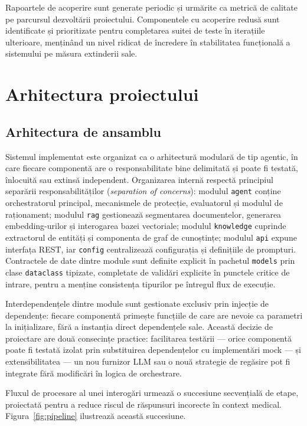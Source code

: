 \documentclass[12pt, a4paper, oneside, romanian]{teza-upb}
\begin{document}
Rapoartele de acoperire sunt generate periodic și urmărite ca metrică de calitate pe parcursul dezvoltării proiectului. Componentele cu acoperire redusă sunt identificate și prioritizate pentru completarea suitei de teste în iterațiile ulterioare, menținând un nivel ridicat de încredere în stabilitatea funcțională a sistemului pe măsura extinderii sale.

\chapter{Arhitectura proiectului}

\section{Arhitectura de ansamblu}
\label{sec:ansamblu}

Sistemul implementat este organizat ca o arhitectură modulară de tip agentic, în care fiecare componentă are o responsabilitate bine delimitată și poate fi testată, înlocuită sau extinsă independent. Organizarea internă respectă principiul separării responsabilităților (\textit{separation of concerns}): modulul \texttt{agent} conține orchestratorul principal, mecanismele de protecție, evaluatorul și modulul de raționament; modulul \texttt{rag} gestionează segmentarea documentelor, generarea embedding-urilor și interogarea bazei vectoriale; modulul \texttt{knowledge} cuprinde extractorul de entități și componenta de graf de cunoștințe; modulul \texttt{api} expune interfața REST, iar \texttt{config} centralizează configurația și definițiile de prompturi. Contractele de date dintre module sunt definite explicit în pachetul \texttt{models} prin clase \texttt{dataclass} tipizate, completate de validări explicite în punctele critice de intrare, pentru a menține consistența tipurilor pe întregul flux de execuție.

Interdependențele dintre module sunt gestionate exclusiv prin injecție de dependențe: fiecare componentă primește funcțiile de care are nevoie ca parametri la inițializare, fără a instanția direct dependențele sale. Această decizie de proiectare are două consecințe practice: facilitarea testării — orice componentă poate fi testată izolat prin substituirea dependențelor cu implementări mock — și extensibilitatea — un nou furnizor LLM sau o nouă strategie de regăsire pot fi integrate fără modificări în logica de orchestrare.

Fluxul de procesare al unei interogări urmează o succesiune secvențială de etape, proiectată pentru a reduce riscul de răspunsuri incorecte în context medical. Figura~\ref{fig:pipeline} ilustrează această succesiune.
\end{document}

